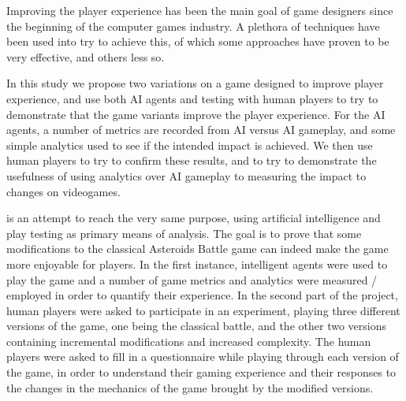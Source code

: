 Improving the player experience has been the main goal of game designers since the beginning of the computer games industry. A plethora of techniques have been used into try to achieve this, of which some approaches  have proven to be very effective, and others less so.

In this study we propose two variations on a game designed to improve player experience, and use both AI agents and testing with human players to try to demonstrate that the game variants improve the player experience. For the AI agents, a number of metrics are recorded from AI versus AI gameplay, and some simple analytics used to see if the intended impact is achieved. We then use human players to try to confirm these results, and to try to demonstrate the usefulness of using analytics over AI gameplay to measuring the impact to changes on videogames.

is an attempt to reach the very same purpose, using artificial intelligence and play testing as primary means of analysis. The goal is to prove that some modifications to the classical Asteroids Battle game can indeed make the game more enjoyable for players.
In the first instance, intelligent agents were used to play the game and a number of game metrics and analytics were measured / employed in order to quantify their experience. In the second part of the project, human players were asked to participate in an experiment, playing three different versions of the game, one being the classical battle, and the other two versions containing incremental modifications and increased complexity. The human players were asked to fill in a questionnaire while playing through each version of the game, in order to understand their gaming experience and their responses to the changes in the mechanics of the game brought by the modified versions.
